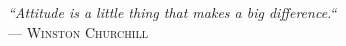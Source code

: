 {\sffamily\itshape
``Attitude is a little thing that makes a big difference.``\\}
--- \textsc{Winston Churchill}
